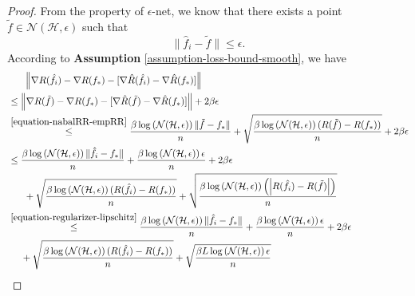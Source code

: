 \documentclass{article}
\begin{document}
\begin{proof}
From the property of $\epsilon$-net, we know that there exists a point
$\tilde{f}\in\mathcal{N}(\mathcal{H},\epsilon)$ such that $$\|\hat{f}_i-\tilde{f}\|\leq \epsilon.$$
According to \textbf{Assumption} \ref{assumption-loss-bound-smooth}, we have
\begin{align}
  \nonumber
    &~~~~~\left\|\nabla R(\hat{f}_i)-\nabla R(f_\ast)-[\nabla \hat{R}(\hat{f}_i)-\nabla \hat{R}(f_\ast)]\right\| \\
   \nonumber &\leq \left\|\nabla R(\tilde{f})-\nabla R(f_\ast)-[\nabla \hat{R}(\tilde{f})-\nabla \hat{R}(f_\ast)]\right\|+2\beta \epsilon\\
   \nonumber &\overset{\eqref{equation-nabalRR-empRR}}{\leq}
   \frac{\beta \log\left(\mathcal{N}(\mathcal{H},\epsilon)\right)\|\tilde{f}-f_\ast\|}{n}+
   \sqrt{\frac{\beta \log\left(\mathcal{N}(\mathcal{H},\epsilon)\right)(R(\tilde{f})-R(f_\ast))}{n}}+2\beta\epsilon\\
   \nonumber&\leq \frac{\beta \log\left(\mathcal{N}(\mathcal{H},\epsilon)\right)\|\hat{f}_i-f_\ast\|}{n}
   +\frac{\beta \log\left(\mathcal{N}(\mathcal{H},\epsilon)\right)\epsilon}{n}+2\beta\epsilon\\
   \nonumber&~~~~~+\sqrt{\frac{\beta \log\left(\mathcal{N}(\mathcal{H},\epsilon)\right)(R(\hat{f}_i)-R(f_\ast))}{n}}+
   \sqrt{\frac{\beta \log\left(\mathcal{N}(\mathcal{H},\epsilon)\right)\left(\left|R(\hat{f}_i)-R(\tilde{f})\right|\right)}{n}}\\
   \nonumber &\overset{\eqref{equation-regularizer-lipschitz}}{\leq} \frac{\beta \log\left(\mathcal{N}(\mathcal{H},\epsilon)\right)\|\hat{f}_i-f_\ast\|}{n}+
   \frac{\beta \log\left(\mathcal{N}(\mathcal{H},\epsilon)\right)\epsilon}{n}+2\beta\epsilon\\
   \label{equation-31}&~~~~+\sqrt{\frac{\beta \log\left(\mathcal{N}(\mathcal{H},\epsilon)\right)(R(\hat{f}_i)-R(f_\ast))}{n}}+
   \sqrt{\frac{\beta L \log\left(\mathcal{N}(\mathcal{H},\epsilon)\right)\epsilon}{n}}
\end{align}


\end{proof}
\end{document}
